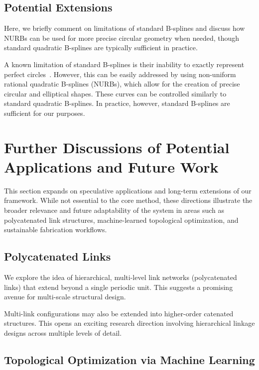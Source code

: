 \documentclass[times,twocolumn,final]{elsarticle}
\begin{document}
\subsection{Potential Extensions} 

Here, we briefly comment on limitations of standard B-splines and discuss how NURBs can be used for more precise circular geometry when needed, though standard quadratic B-splines are typically sufficient in practice.

A known limitation of standard B-splines is their inability to exactly represent perfect circles~\cite{bartels1995introduction}. However, this can be easily addressed by using non-uniform rational quadratic B-splines (NURBs), which allow for the creation of precise circular and elliptical shapes. These curves can be controlled similarly to standard quadratic B-splines. In practice, however, standard B-splines are sufficient for our purposes.

\section{Further Discussions of Potential Applications and Future Work}

This section expands on speculative applications and long-term extensions of our framework. While not essential to the core method, these directions illustrate the broader relevance and future adaptability of the system in areas such as polycatenated link structures, machine-learned topological optimization, and sustainable fabrication workflows.

\subsection{Polycatenated Links} 

We explore the idea of hierarchical, multi-level link networks (polycatenated links) that extend beyond a single periodic unit. This suggests a promising avenue for multi-scale structural design.

Multi-link configurations may also be extended into higher-order catenated structures. This opens an exciting research direction involving hierarchical linkage designs across multiple levels of detail.


\subsection{Topological Optimization via Machine Learning}
\end{document}
